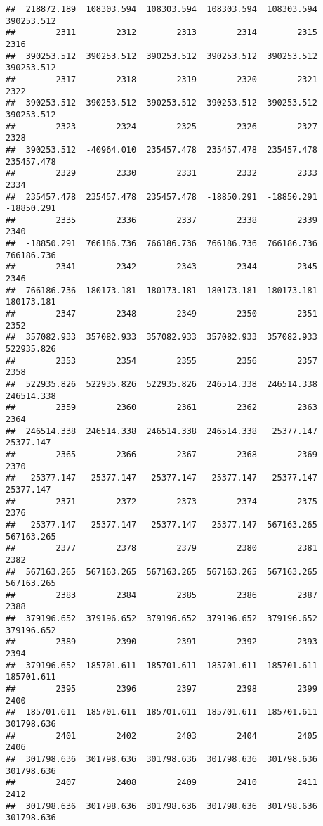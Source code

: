 \documentclass[
]{book}
\begin{document}
\begin{verbatim}
##  218872.189  108303.594  108303.594  108303.594  108303.594  390253.512 
##        2311        2312        2313        2314        2315        2316 
##  390253.512  390253.512  390253.512  390253.512  390253.512  390253.512 
##        2317        2318        2319        2320        2321        2322 
##  390253.512  390253.512  390253.512  390253.512  390253.512  390253.512 
##        2323        2324        2325        2326        2327        2328 
##  390253.512  -40964.010  235457.478  235457.478  235457.478  235457.478 
##        2329        2330        2331        2332        2333        2334 
##  235457.478  235457.478  235457.478  -18850.291  -18850.291  -18850.291 
##        2335        2336        2337        2338        2339        2340 
##  -18850.291  766186.736  766186.736  766186.736  766186.736  766186.736 
##        2341        2342        2343        2344        2345        2346 
##  766186.736  180173.181  180173.181  180173.181  180173.181  180173.181 
##        2347        2348        2349        2350        2351        2352 
##  357082.933  357082.933  357082.933  357082.933  357082.933  522935.826 
##        2353        2354        2355        2356        2357        2358 
##  522935.826  522935.826  522935.826  246514.338  246514.338  246514.338 
##        2359        2360        2361        2362        2363        2364 
##  246514.338  246514.338  246514.338  246514.338   25377.147   25377.147 
##        2365        2366        2367        2368        2369        2370 
##   25377.147   25377.147   25377.147   25377.147   25377.147   25377.147 
##        2371        2372        2373        2374        2375        2376 
##   25377.147   25377.147   25377.147   25377.147  567163.265  567163.265 
##        2377        2378        2379        2380        2381        2382 
##  567163.265  567163.265  567163.265  567163.265  567163.265  567163.265 
##        2383        2384        2385        2386        2387        2388 
##  379196.652  379196.652  379196.652  379196.652  379196.652  379196.652 
##        2389        2390        2391        2392        2393        2394 
##  379196.652  185701.611  185701.611  185701.611  185701.611  185701.611 
##        2395        2396        2397        2398        2399        2400 
##  185701.611  185701.611  185701.611  185701.611  185701.611  301798.636 
##        2401        2402        2403        2404        2405        2406 
##  301798.636  301798.636  301798.636  301798.636  301798.636  301798.636 
##        2407        2408        2409        2410        2411        2412 
##  301798.636  301798.636  301798.636  301798.636  301798.636  301798.636 

\end{verbatim}
\end{document}
